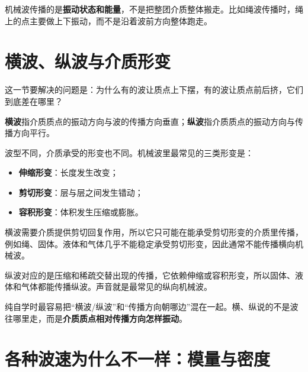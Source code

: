\documentclass[lang=cn,11pt]{elegantbook}
\begin{document}
\begin{note}
机械波传播的是\textbf{振动状态和能量}，不是把整团介质整体搬走。比如绳波传播时，绳上的点主要做上下振动，而不是沿着波前方向整体跑走。
\end{note}

\section{横波、纵波与介质形变}

这一节要解决的问题是：为什么有的波让质点上下摆，有的波让质点前后挤，它们到底差在哪里？

\textbf{横波}指介质质点的振动方向与波的传播方向垂直；\textbf{纵波}指介质质点的振动方向与传播方向平行。

波型不同，介质承受的形变也不同。机械波里最常见的三类形变是：
\begin{itemize}
  \item \textbf{伸缩形变}：长度发生改变；
  \item \textbf{剪切形变}：层与层之间发生错动；
  \item \textbf{容积形变}：体积发生压缩或膨胀。
\end{itemize}

横波需要介质提供剪切回复作用，所以它只可能在能承受剪切形变的介质里传播，例如绳、固体。液体和气体几乎不能稳定承受剪切形变，因此通常不能传播横向机械波。

纵波对应的是压缩和稀疏交替出现的传播，它依赖伸缩或容积形变，所以固体、液体和气体都能传播纵波。声音就是最常见的纵向机械波。

\begin{note}
纯自学时最容易把“横波/纵波”和“传播方向朝哪边”混在一起。横、纵说的不是波往哪里走，而是\textbf{介质质点相对传播方向怎样振动}。
\end{note}

\section{各种波速为什么不一样：模量与密度}
\end{document}
